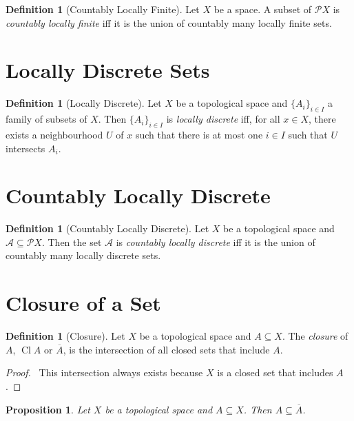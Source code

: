 \documentclass{report}
\let\qed\relax
\newtheorem{prop}[lm]{Proposition}
\theoremstyle{definition}
\newtheorem{df}[lm]{Definition}
\newcommand{\Cl}{\ensuremath{\operatorname{Cl}}}
\begin{document}
  \begin{df}[Countably Locally Finite]
    Let $X$ be a space. A subset of $\mathcal{P} X$ is \emph{countably locally finite} iff it is the union of countably many locally finite sets.
  \end{df}

\section{Locally Discrete Sets}

\begin{df}[Locally Discrete]
  Let $X$ be a topological space and $\{ A_i \}_{i \in I}$ a family of subsets of $X$. Then $\{ A_i \}_{i \in I}$ is \emph{locally discrete} iff, for all $x \in X$, there exists a neighbourhood $U$ of $x$ such that there is at most one $i \in I$ such that $U$ intersects $A_i$.
\end{df}

\section{Countably Locally Discrete}

\begin{df}[Countably Locally Discrete]
  Let $X$ be a topological space and $\mathcal{A} \subseteq \mathcal{P} X$. Then the set $\mathcal{A}$ is \emph{countably locally discrete} iff it is the union of countably many locally discrete sets.
\end{df}

  \section{Closure of a Set}

  \begin{df}[Closure]
    Let $X$ be a topological space and $A \subseteq X$. The \emph{closure} of
    $A$, $\Cl A$ or $\overline{A}$, is the intersection of all closed sets that
    include $A$.
  \end{df}

  \begin{proof}
    \pf\ This intersection always exists because $X$ is a closed set that
    includes $A$. \qed
  \end{proof}

  \begin{prop}
    \label{prop:topology:closure:A_sub_Abar}
    Let $X$ be a topological space and $A \subseteq X$. Then $A \subseteq
    \overline{A}$.
  \end{prop}
\end{document}
